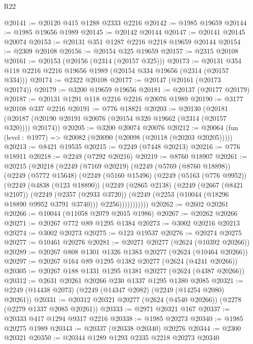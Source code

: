 \begin{lexlean}{R22}
\begin{coremodule}
@20141 := @20120 @415 @1288 @2333 @2216
@20142 := @1985 @19659
@20144 := @1985 @19656 @1989
@20145 := @20142 @20144
@20147 := @20141 @20145 @20074
@20153 := @20131 @351 @1287 @2216 @2218 @19659 @20144
@20154 := @2309 @20108
@20156 := @20154 @325 @19659
@20157 := @2315 @20108
@20161 := @20153 (@20156 (@2314 (@20157 @325)))
@20173 := @20131 @354 @118 @2216 @2216 @19656 @1989 (@20154 @334 @19656 (@2314 (@20157 @334)))
@20174 := @2322 @20108
@20177 := @20147 (@20161 (@20173 @20174))
@20179 := @3200 @19659 @19656
@20181 := @20137 (@20177 @20179)
@20187 := @20131 @1291 @118 @2216 @2216 @20076 @1989
@20190 := @3177 @20108 @337 @2216
@20191 := @776 @18821
@20203 := @20130
    (@20181 (@20187 (@20190 @20191 @20076 (@20154 @320 @19662 (@2314 (@20157 @320)))) @20174))
@20205 := @3200 @20074 @20076
@20212 := @20064 (fun (level : @1977) => @20082 (@20090 (@20098 (@20118 (@20203 @20205)))))
@20213 := @8421 @19535
@20215 := @2249 (@7448 @20213)
@20216 := @776 @18911
@20218 := @2249 (@7292 @20216)
@20219 := @8760 @18907
@20261 := @20215
    (@20218
      (@2249
        (@7169 @20219)
        (@2249
          (@5769 (@8760 @18898))
          (@2249
            (@5772 @15648)
            (@2249
              (@5160 @15496)
              (@2249
                (@5163 (@776 @9952))
                (@2249
                  (@4838 (@123 @18890))
                  (@2249
                    (@2865 @2138)
                    (@2249
                      (@2667 (@8421 @2107))
                      (@2249
                        (@2357 (@2933 @3720))
                        (@2249 (@2253 (@10044 (@18296 @18890 @9952 @3791 @3740))) @2256)))))))))))
@20262 := @2602 @20261
@20266 := @10044 (@11058 @2079 @2015 @1986)
@20267 := @20262 @20266
@20271 := @20267 @772 @89 @1295 @1384
@20273 := @3002 @20216 @20213
@20274 := @3002 @20273
@20275 := @123 @19537
@20276 := @20274 @20275
@20277 := @10461 @20276
@20281 := @20271 @20277 (@2624 (@10392 @20266))
@20289 := @20267 @808 @1301 @1326 @1383 @20277 (@2624 (@10464 @20266))
@20297 := @20267 @164 @89 @1295 @1382 @20277 (@2624 (@4241 @20266))
@20305 := @20267 @188 @1331 @1295 @1381 @20277 (@2624 (@4387 @20266))
@20312 := @2631 @20261 @20266 @230 @1337 @1295 @1380 @2085
@20321 := @2249 (@14438 @2073) (@2249 (@14347 @2082) (@2249 (@14254 @2080) @20261))
@20331 := @20312 @20321 @20277 (@2624 (@4540 @20266)) (@2278 (@2279 @1337 @2085 @20261))
@20333 := @2971 @20321 @167
@20337 := @20333 @417 @1294 @9317 @2216
@20338 := @1985 @20273
@20340 := @1985 @20275 @1989
@20343 := @20337 (@20338 @20340) @20276
@20344 := @2300 @20321
@20350 := @20344 @1289 @1293 @2335 @2218 @20273 @20340

\end{coremodule}
\end{lexlean}
